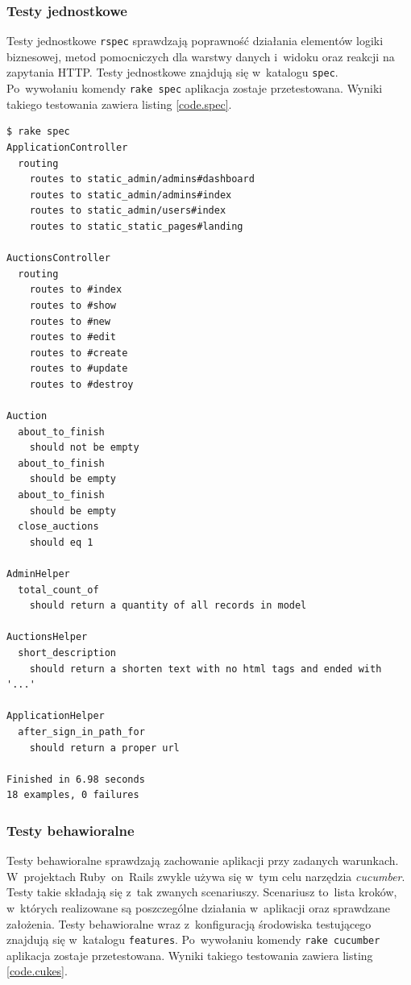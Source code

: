 \subsubsection{Testy jednostkowe}

Testy jednostkowe \texttt{rspec} sprawdzają poprawność działania elementów logiki biznesowej, metod pomocniczych dla warstwy danych i~widoku oraz reakcji na zapytania HTTP. Testy jednostkowe znajdują się w~katalogu \texttt{spec}. Po~wywołaniu komendy \verb+rake spec+ aplikacja zostaje przetestowana. Wyniki takiego testowania zawiera listing \ref{code.spec}.

\begin{lstlisting}[label={code.spec}]
$ rake spec
ApplicationController
  routing
    routes to static_admin/admins#dashboard
    routes to static_admin/admins#index
    routes to static_admin/users#index
    routes to static_static_pages#landing

AuctionsController
  routing
    routes to #index
    routes to #show
    routes to #new
    routes to #edit
    routes to #create
    routes to #update
    routes to #destroy

Auction
  about_to_finish
    should not be empty
  about_to_finish
    should be empty
  about_to_finish
    should be empty
  close_auctions
    should eq 1

AdminHelper
  total_count_of
    should return a quantity of all records in model

AuctionsHelper
  short_description
    should return a shorten text with no html tags and ended with '...'

ApplicationHelper
  after_sign_in_path_for
    should return a proper url

Finished in 6.98 seconds
18 examples, 0 failures
\end{lstlisting}

\subsubsection{Testy behawioralne}

Testy behawioralne sprawdzają zachowanie aplikacji przy zadanych warunkach. W~projektach Ruby~on~Rails zwykle używa się w~tym celu narzędzia \textit{cucumber}. Testy takie składają się z~tak zwanych scenariuszy. Scenariusz to~lista kroków, w~których realizowane są poszczególne działania w~aplikacji oraz sprawdzane założenia. Testy behawioralne wraz z~konfiguracją środowiska testującego znajdują się w~katalogu \texttt{features}. Po~wywołaniu komendy \verb+rake cucumber+ aplikacja zostaje przetestowana. Wyniki takiego testowania zawiera listing \ref{code.cukes}.

